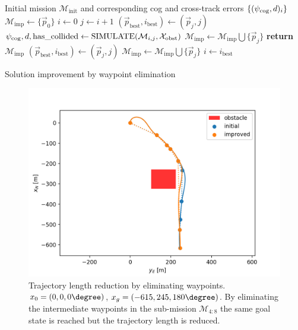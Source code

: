 \begin{algorithm}
    \begin{algorithmic}
        \Require Initial mission $\mathcal{M}_{\text{init}}$ and corresponding \ac{cog} and cross-track errors $\{(\psi_{\text{cog}},d)_i\}$
        \State $\mathcal{M}_{\text{imp}}\gets \{\vec{p}_0\}$
        \State $i\gets 0$
            \State $j\gets i+1$
            \State $(\vec{p}_{\text{best}},i_{\text{best}})\gets(\vec{p}_j,j)$
                \State $\psi_{\text{cog}},d,\text{has\_collided}\gets\text{SIMULATE}(\mathcal{M}_{i,j}, \mathcal{X}_{\text{obst}})$
                        \State $\mathcal{M}_{\text{imp}}\gets \mathcal{M}_{\text{imp}} \bigcup \{\vec{p}_j\}$
                        \State \textbf{return} $\mathcal{M}_{\text{imp}}$
                    \EndIf
                    \State $(\vec{p}_{\text{best}},i_{\text{best}})\gets(\vec{p}_j,j)$
                \EndIf
            \EndWhile
            \State $\mathcal{M}_{\text{imp}}\gets \mathcal{M}_{\text{imp}} \bigcup \{\vec{p}_j\}$
            \State $i\gets i_{\text{best}}$
        \EndWhile 
    \end{algorithmic}
    \caption{Solution improvement by waypoint elimination}
    \label{alg:imp}
\end{algorithm}

\begin{figure}
    \begin{center}
        \includegraphics[width=\linewidth]{fig/sol_improved}
        \caption{Trajectory length reduction by eliminating waypoints. $x_0=(0,0,0\degree)$, $x_g=(-615, 245, 180\degree)$. By eliminating the intermediate waypoints in the sub-mission $\mathcal{M}_{4:8}$ the same goal state is reached but the trajectory length is reduced.}
        \label{fig:imp}
    \end{center}
\end{figure}

